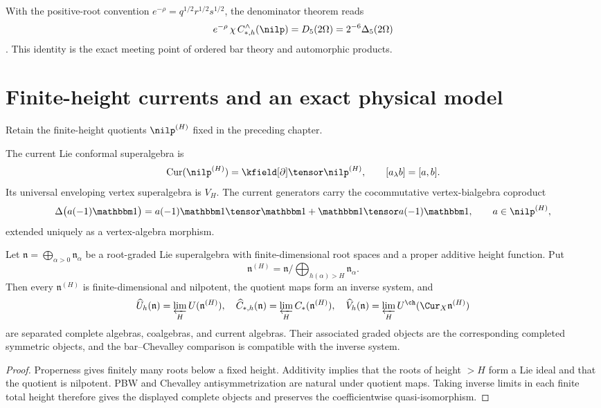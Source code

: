 With the positive-root convention $e^{-\rho}=q^{1/2}r^{1/2}s^{1/2}$, the denominator theorem reads
\[
 e^{-\rho}\,\chi\,C_{*,h}^\wedge(\nilp)=D_5(2\Omega)=2^{-6}\Delta_5(2\Omega)
\]
\cite{GN97,GN98b}. This identity is the exact meeting point of ordered bar theory and automorphic products.

\chapter{Finite-height currents and an exact physical model}
Retain the finite-height quotients $\nilp^{(H)}$ fixed in the preceding chapter.

The current Lie conformal superalgebra is
\[
 \operatorname{Cur}(\nilp^{(H)})=\kfield[\partial]\tensor\nilp^{(H)},
 \qquad [a_\lambda b]=[a,b].
\]
Its universal enveloping vertex superalgebra is $V_H$. The current generators carry the cocommutative vertex-bialgebra coproduct
\[
 \Delta\bigl(a(-1)\mathbbm1\bigr)
 =a(-1)\mathbbm1\tensor\mathbbm1
 +\mathbbm1\tensor a(-1)\mathbbm1,
 \qquad a\in\nilp^{(H)},
\]
extended uniquely as a vertex-algebra morphism.

\begin{theorem}
Let $\mathfrak n=\bigoplus_{\alpha>0}\mathfrak n_\alpha$ be a root-graded Lie superalgebra with finite-dimensional root spaces and a proper additive height function.  Put
\[
 \mathfrak n^{(H)}=\mathfrak n/\!\bigoplus_{h(\alpha)>H}\mathfrak n_\alpha.
\]
Then every $\mathfrak n^{(H)}$ is finite-dimensional and nilpotent, the quotient maps form an inverse system, and
\[
 \widehat U_h(\mathfrak n)=\varprojlim_HU(\mathfrak n^{(H)}),\quad
 \widehat C_{*,h}(\mathfrak n)=\varprojlim_HC_*(\mathfrak n^{(H)}),\quad
 \widehat V_h(\mathfrak n)=\varprojlim_HU^{\ch}(\Cur_X\mathfrak n^{(H)})
\]
are separated complete algebras, coalgebras, and current algebras.  Their associated graded objects are the corresponding completed symmetric objects, and the bar--Chevalley comparison is compatible with the inverse system.
\end{theorem}
\begin{proof}
Properness gives finitely many roots below a fixed height.  Additivity implies that the roots of height $>H$ form a Lie ideal and that the quotient is nilpotent.  PBW and Chevalley antisymmetrization are natural under quotient maps.  Taking inverse limits in each finite total height therefore gives the displayed complete objects and preserves the coefficientwise quasi-isomorphism.
\end{proof}


